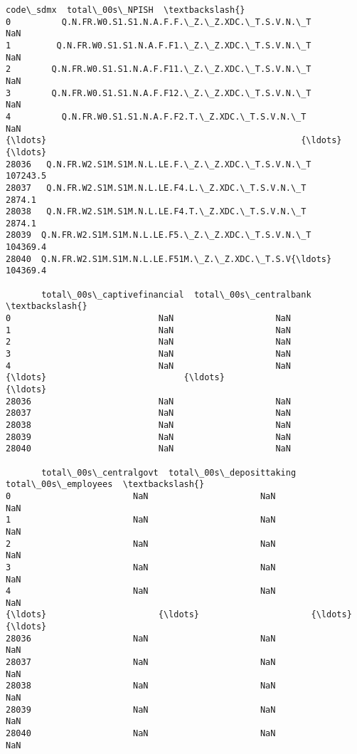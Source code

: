 \documentclass[11pt]{article}
\begin{document}
    \begin{Verbatim}[commandchars=\\\{\}]
                                               code\_sdmx  total\_00s\_NPISH  \textbackslash{}
0          Q.N.FR.W0.S1.S1.N.A.F.F.\_Z.\_Z.XDC.\_T.S.V.N.\_T              NaN
1         Q.N.FR.W0.S1.S1.N.A.F.F1.\_Z.\_Z.XDC.\_T.S.V.N.\_T              NaN
2        Q.N.FR.W0.S1.S1.N.A.F.F11.\_Z.\_Z.XDC.\_T.S.V.N.\_T              NaN
3        Q.N.FR.W0.S1.S1.N.A.F.F12.\_Z.\_Z.XDC.\_T.S.V.N.\_T              NaN
4          Q.N.FR.W0.S1.S1.N.A.F.F2.T.\_Z.XDC.\_T.S.V.N.\_T              NaN
{\ldots}                                                  {\ldots}              {\ldots}
28036   Q.N.FR.W2.S1M.S1M.N.L.LE.F.\_Z.\_Z.XDC.\_T.S.V.N.\_T         107243.5
28037   Q.N.FR.W2.S1M.S1M.N.L.LE.F4.L.\_Z.XDC.\_T.S.V.N.\_T           2874.1
28038   Q.N.FR.W2.S1M.S1M.N.L.LE.F4.T.\_Z.XDC.\_T.S.V.N.\_T           2874.1
28039  Q.N.FR.W2.S1M.S1M.N.L.LE.F5.\_Z.\_Z.XDC.\_T.S.V.N.\_T         104369.4
28040  Q.N.FR.W2.S1M.S1M.N.L.LE.F51M.\_Z.\_Z.XDC.\_T.S.V{\ldots}         104369.4

       total\_00s\_captivefinancial  total\_00s\_centralbank  \textbackslash{}
0                             NaN                    NaN
1                             NaN                    NaN
2                             NaN                    NaN
3                             NaN                    NaN
4                             NaN                    NaN
{\ldots}                           {\ldots}                    {\ldots}
28036                         NaN                    NaN
28037                         NaN                    NaN
28038                         NaN                    NaN
28039                         NaN                    NaN
28040                         NaN                    NaN

       total\_00s\_centralgovt  total\_00s\_deposittaking  total\_00s\_employees  \textbackslash{}
0                        NaN                      NaN                  NaN
1                        NaN                      NaN                  NaN
2                        NaN                      NaN                  NaN
3                        NaN                      NaN                  NaN
4                        NaN                      NaN                  NaN
{\ldots}                      {\ldots}                      {\ldots}                  {\ldots}
28036                    NaN                      NaN                  NaN
28037                    NaN                      NaN                  NaN
28038                    NaN                      NaN                  NaN
28039                    NaN                      NaN                  NaN
28040                    NaN                      NaN                  NaN


\end{Verbatim}
\end{document}
